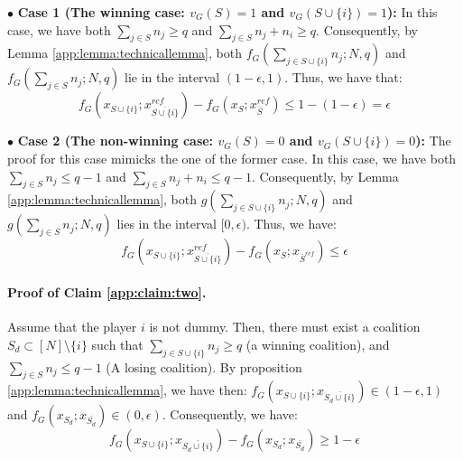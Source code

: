 
$\bullet$ \textbf{Case 1 (The winning case: $v_{G}(S) = 1$ and $v_{G}(S \cup \{i\}) = 1$):} In this case, we have both $\sum\limits_{j \in S} n_{j} \geq q$ and $\sum\limits_{j \in S} n_{j} + n_{i} \geq q$. Consequently, by Lemma \ref{app:lemma:technicallemma}, both
$f_G(\sum\limits_{j \in S \cup \{i\}} n_{j}; N,q)$ and $f_G(\sum\limits_{j \in S} n_{j}; N,q)$ lie 
in the interval $(1 - \epsilon,1)$. Thus, we have 
 that:
$$f_{G}(x_{S \cup \{i\}};x_{\bar{S \cup \{i\}}}^{ref}) - f_{G}(x_{S}; x_{\bar{S}}^{ref}) \leq 1 - (1 - \epsilon) = \epsilon$$

$\bullet$ \textbf{Case 2 (The non-winning case: $v_{G}(S) = 0$ and $v_{G}(S \cup \{i\}) = 0$):} The proof for this case mimicks the one of the former case. In this case, we have both $\sum\limits_{j \in S} n_{j} \leq q-1$ and $\sum\limits_{j \in S} n_{j} + n_{i} \leq q-1$. Consequently, by Lemma \ref{app:lemma:technicallemma}, both
$g(\sum\limits_{j \in S \cup \{i\}} n_{j}; N,q)$ and $g(\sum\limits_{j \in S} n_{j}; N,q)$ lies 
in the interval $[0, \epsilon)$. Thus, we have:
$$f_{G}(x_{S \cup \{i\}};x_{\bar{S \cup \{i\}}}^{ref}) - f_{G}(x_{S}; x_{\bar{S}^{ref}}) \leq \epsilon$$

\begin{comment}
($\impliedby$) Assume that for any coalition $S \subseteq [N] \setminus \{i\}$, the condition \eqref{app:eq:claim1} holds. We need to prove that the player $i$ is dummy. Assume that the player $i$ is not dummy. Then, there must exist a coalition $S' \subseteq \{i\}$ such that $\sum\limits_{j \in S'} n_{j} \leq q-1$ and $\sum\limits_{j \in S'} n_{j} + n_{i} \geq q$. Then, we have:
$$f_{G}(x_{S \cup \{i\}};x_{\bar{S \cup \{i\}}}^{ref}) - f_{G}(x_{S}; x_{\bar{S}^{ref}}) = g(\sum\limits_{j \in S \cup \{i\}} n_{j}; N,q) - g(\sum\limits_{j \in S} n_{j}; N,q) \geq \frac{N}{N+1} - \frac{1}{N+1} = \frac{N-1}{N+1} \geq \frac{1}{N+1}$$
violating the condition \eqref{app:eq:claim1}, which leads to a contradiction. Consequently, the player $i$ is dummy.
\end{comment}

\paragraph{Proof of Claim \ref{app:claim:two}.} Assume that the player $i$ is not dummy. Then, there must exist a coalition $S_{d} \subset [N] \setminus \{i\}$ such that $\sum\limits_{j \in S \cup \{i\}} n_{j} \geq q$ (a winning coalition), and $\sum\limits_{j \in S } n_{j} \leq q-1$ (A losing coalition). By proposition \ref{app:lemma:technicallemma}, we have then: $f_{G}(x_{S \cup \{i\}}; x_{\bar{S_{d} \cup \{i\}}}) \in (1 - \epsilon,1)$ and $f_{G}(x_{S_{d}}; x_{\bar{S_{d}}}) \in (0,\epsilon)$. Consequently, we have:
   $$f_{G}(x_{S \cup \{i\}}; x_{\bar{S_{d} \cup \{i\}}}) - f_{G}(x_{S_{d}}; x_{\bar{S_{d}}}) \geq 1 - \epsilon$$
